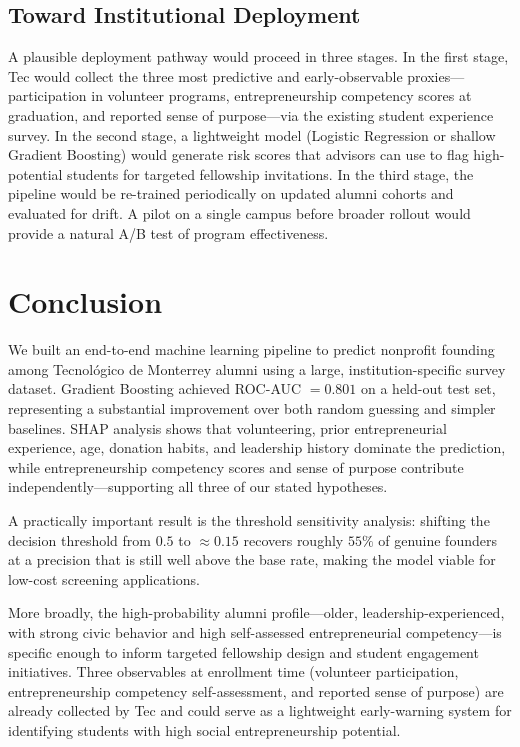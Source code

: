 \documentclass[10pt,twocolumn]{article}
\begin{document}
\subsection{Toward Institutional Deployment}

A plausible deployment pathway would proceed in three stages. In the first stage, Tec would collect the three most predictive and early-observable proxies—participation in volunteer programs, entrepreneurship competency scores at graduation, and reported sense of purpose—via the existing student experience survey. In the second stage, a lightweight model (Logistic Regression or shallow Gradient Boosting) would generate risk scores that advisors can use to flag high-potential students for targeted fellowship invitations. In the third stage, the pipeline would be re-trained periodically on updated alumni cohorts and evaluated for drift. A pilot on a single campus before broader rollout would provide a natural A/B test of program effectiveness.

\section{Conclusion}
\label{sec:conclusion}

We built an end-to-end machine learning pipeline to predict nonprofit founding among Tecnológico de Monterrey alumni using a large, institution-specific survey dataset. Gradient Boosting achieved ROC-AUC $= 0.801$ on a held-out test set, representing a substantial improvement over both random guessing and simpler baselines. SHAP analysis shows that volunteering, prior entrepreneurial experience, age, donation habits, and leadership history dominate the prediction, while entrepreneurship competency scores and sense of purpose contribute independently—supporting all three of our stated hypotheses.

A practically important result is the threshold sensitivity analysis: shifting the decision threshold from $0.5$ to $\approx 0.15$ recovers roughly $55\%$ of genuine founders at a precision that is still well above the base rate, making the model viable for low-cost screening applications.

More broadly, the high-probability alumni profile—older, leadership-experienced, with strong civic behavior and high self-assessed entrepreneurial competency—is specific enough to inform targeted fellowship design and student engagement initiatives. Three observables at enrollment time (volunteer participation, entrepreneurship competency self-assessment, and reported sense of purpose) are already collected by Tec and could serve as a lightweight early-warning system for identifying students with high social entrepreneurship potential.
\end{document}
